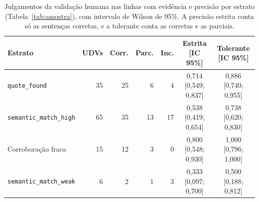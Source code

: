 \begin{table}[!htb]
  \centering
  \caption{Julgamentos da validação humana nas linhas com evidência e precisão por estrato
  (Tabela~\ref{tab:amostra}), com intervalo de Wilson de 95\%. A precisão estrita conta só as sentenças corretas, e a tolerante
  conta as corretas e as parciais.}
  \label{tab:validacao}
  \small
  \begin{tabularx}{\textwidth}{@{}>{\raggedright\arraybackslash}Xrrrrcc@{}}
    \toprule
    \textbf{Estrato} & \textbf{UDVs} & \textbf{Corr.} & \textbf{Parc.} & \textbf{Inc.} & \textbf{Estrita [IC 95\%]} & \textbf{Tolerante [IC 95\%]} \\
    \midrule
    \texttt{quote\_found}                                 & 35 & 25 &  6 &  4 & 0,714 [0,549; 0,837] & 0,886 [0,740; 0,955] \\
    \texttt{semantic\_match\_high}                        & 65 & 35 & 13 & 17 & 0,538 [0,419; 0,654] & 0,738 [0,620; 0,830] \\
    Corroboração fraca                                    & 15 & 12 &  3 &  0 & 0,800 [0,548; 0,930] & 1,000 [0,796; 1,000] \\
    \texttt{semantic\_match\_weak}                        &  6 &  2 &  1 &  3 & 0,333 [0,097; 0,700] & 0,500 [0,188; 0,812] \\
    \bottomrule
  \end{tabularx}
\end{table}
